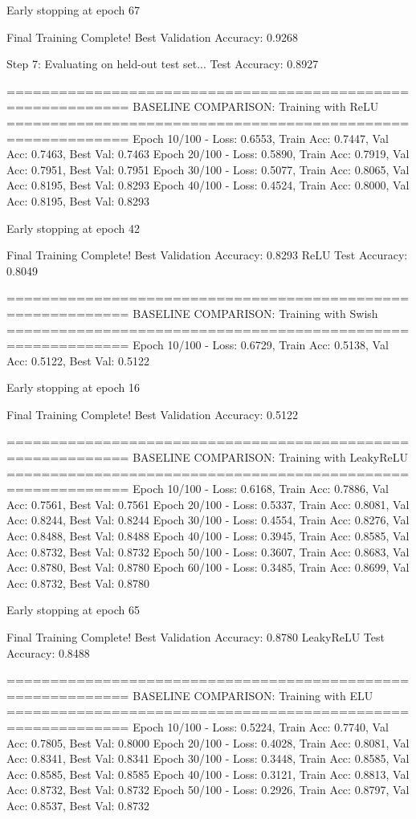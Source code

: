 Early stopping at epoch 67

Final Training Complete!
Best Validation Accuracy: 0.9268

Step 7: Evaluating on held-out test set...
Test Accuracy: 0.8927

============================================================
BASELINE COMPARISON: Training with ReLU
============================================================
Epoch  10/100 - Loss: 0.6553, Train Acc: 0.7447, Val Acc: 0.7463, Best Val: 0.7463
Epoch  20/100 - Loss: 0.5890, Train Acc: 0.7919, Val Acc: 0.7951, Best Val: 0.7951
Epoch  30/100 - Loss: 0.5077, Train Acc: 0.8065, Val Acc: 0.8195, Best Val: 0.8293
Epoch  40/100 - Loss: 0.4524, Train Acc: 0.8000, Val Acc: 0.8195, Best Val: 0.8293

Early stopping at epoch 42

Final Training Complete!
Best Validation Accuracy: 0.8293
ReLU Test Accuracy: 0.8049

============================================================
BASELINE COMPARISON: Training with Swish
============================================================
Epoch  10/100 - Loss: 0.6729, Train Acc: 0.5138, Val Acc: 0.5122, Best Val: 0.5122

Early stopping at epoch 16

Final Training Complete!
Best Validation Accuracy: 0.5122

============================================================
BASELINE COMPARISON: Training with LeakyReLU
============================================================
Epoch  10/100 - Loss: 0.6168, Train Acc: 0.7886, Val Acc: 0.7561, Best Val: 0.7561
Epoch  20/100 - Loss: 0.5337, Train Acc: 0.8081, Val Acc: 0.8244, Best Val: 0.8244
Epoch  30/100 - Loss: 0.4554, Train Acc: 0.8276, Val Acc: 0.8488, Best Val: 0.8488
Epoch  40/100 - Loss: 0.3945, Train Acc: 0.8585, Val Acc: 0.8732, Best Val: 0.8732
Epoch  50/100 - Loss: 0.3607, Train Acc: 0.8683, Val Acc: 0.8780, Best Val: 0.8780
Epoch  60/100 - Loss: 0.3485, Train Acc: 0.8699, Val Acc: 0.8732, Best Val: 0.8780

Early stopping at epoch 65

Final Training Complete!
Best Validation Accuracy: 0.8780
LeakyReLU Test Accuracy: 0.8488

============================================================
BASELINE COMPARISON: Training with ELU
============================================================
Epoch  10/100 - Loss: 0.5224, Train Acc: 0.7740, Val Acc: 0.7805, Best Val: 0.8000
Epoch  20/100 - Loss: 0.4028, Train Acc: 0.8081, Val Acc: 0.8341, Best Val: 0.8341
Epoch  30/100 - Loss: 0.3448, Train Acc: 0.8585, Val Acc: 0.8585, Best Val: 0.8585
Epoch  40/100 - Loss: 0.3121, Train Acc: 0.8813, Val Acc: 0.8732, Best Val: 0.8732
Epoch  50/100 - Loss: 0.2926, Train Acc: 0.8797, Val Acc: 0.8537, Best Val: 0.8732

